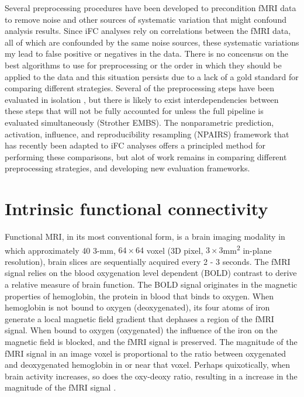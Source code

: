 Several preprocessing procedures have been developed to precondition fMRI data to remove noise and other sources of systematic variation that might confound analysis results. Since iFC analyses rely on correlations between the fMRI data, all of which are confounded by the same noise sources, these systematic variations my lead to false positive or negatives in the data. There is no concensus on the best algorithms to use for preprocessing or the order in which they should be applied to the data and this situation persists due to a lack of a gold standard for comparing different strategies. Several of the preprocessing steps have been evaluated in isolation \cite{Powers, VanDijk, Yan, Yan, Satterthwaite, Satterthwaite, Murphy, Birn, Chang, Saad}, but there is likely to exist interdependencies between these steps that will not be fully accounted for unless the full pipeline is evaluated simultaneously (Strother EMBS). The nonparametric prediction, activation, influence, and reproducibility
resampling (NPAIRS) framework \cite{Strother2002, Laconte2003} that has recently been adapted to iFC analyses \cite{Chu2012, Craddock2013} offers a principled method for performing these comparisons, but alot of work remains in comparing different preprocessing strategies, and developing new evaluation frameworks.





















\section{Intrinsic functional connectivity}

Functional MRI, in its most conventional form, is a brain imaging modality in which approximately 40 3-\si{\milli\meter}, $64 \times 64$ voxel (3D pixel, $3\times3$\si{\milli\meter\squared} in-plane resolution), brain slices are sequentially acquired every 2 - 3 seconds. The fMRI signal relies on the blood oxygenation level dependent (BOLD) contrast to derive a relative measure of brain function. The BOLD signal originates in the magnetic properties of hemoglobin, the protein in blood that binds to oxygen. When hemoglobin is not bound to oxygen (deoxygenated), its four atoms of iron generate a local magnetic field gradient that dephases a region of the fMRI signal. When bound to oxygen (oxygenated) the influence of the iron on the magnetic field is blocked, and the fMRI signal is preserved. The magnitude of the fMRI signal in an image voxel is proportional to the ratio between oxygenated and deoxygenated hemoglobin in or near that voxel. Perhaps quixotically, when brain activity increases, so does the oxy-deoxy ratio, resulting in a increase in the magnitude of the fMRI signal \cite{fmribook}. 

